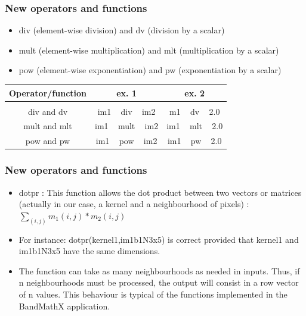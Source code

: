 \documentclass[8pt]{beamer}
\begin{document}
\begin{frame}
\frametitle{New operators and functions}


\begin{itemize}
\item div (element-wise division) and dv (division by a scalar)
\item mult (element-wise multiplication) and mlt (multiplication by a scalar)
\item pow (element-wise exponentiation) and pw (exponentiation by a scalar)
\end{itemize}


\begin{center}
\begin{tabular}{c | c | c}
Operator/function & ex. 1 & ex. 2 \\
\hline \\
div and dv & im1 ~ div ~ im2 &  m1 ~ dv ~ 2.0 \\
mult and mlt & im1 ~  mult ~ im2 & im1 ~  mlt ~ 2.0  \\
pow and pw & im1 ~ pow ~ im2 & im1 ~ pw ~ 2.0
\end{tabular}
\end{center}


\end{frame}


\begin{frame}
\frametitle{New operators and functions}


\begin{itemize}
\item dotpr : This function allows the dot product between two vectors or matrices (actually in our case, a kernel and a neighbourhood of pixels) : $\sum_{(i,j)} m_1(i,j)*m_2(i,j)$


\item For instance: dotpr(kernel1,im1b1N3x5) is correct provided that kernel1 and im1b1N3x5 have the same dimensions. 
\item The function can take as many neighbourhoods as needed in inputs. Thus, if n neighbourhoods must be processed, the output will consist in a row vector of n values. This behaviour is typical of the functions implemented in the BandMathX application.
\end{itemize}

\end{frame}
\end{document}
